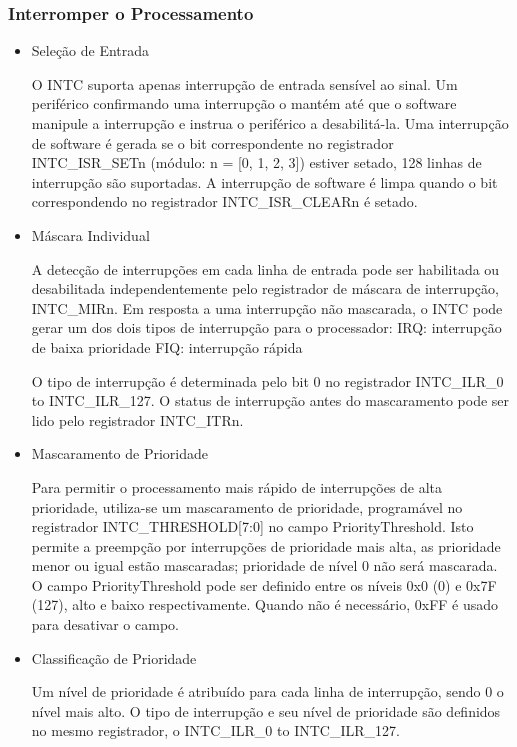 \documentclass[12pt]{article}
\begin{document}
		\subsubsection{Interromper o Processamento}
			\begin{itemize}
				\item Seleção de Entrada \
				
					O INTC suporta apenas interrupção de entrada sensível ao sinal. Um periférico confirmando uma interrupção o mantém até que o software manipule a interrupção e instrua o periférico a desabilitá-la. Uma interrupção de software é gerada se o bit correspondente no registrador INTC\_ISR\_SETn (módulo: n = [0, 1, 2, 3]) estiver setado, 128 linhas de interrupção são suportadas. A interrupção de software é limpa quando o bit correspondendo no registrador INTC\_ISR\_CLEARn é setado. 
					\newpage
				\item Máscara Individual \
				
					A detecção de interrupções em cada linha de entrada pode ser habilitada ou desabilitada independentemente pelo registrador de máscara de interrupção, INTC\_MIRn. Em resposta a uma interrupção não mascarada, o INTC pode gerar um dos dois tipos de interrupção para o processador:
						\subitem IRQ: interrupção de baixa prioridade
						\subitem FIQ: interrupção rápida \
						
					O tipo de interrupção é determinada pelo bit 0 no registrador INTC\_ILR\_0 to INTC\_ILR\_127. O status de interrupção antes do mascaramento pode ser lido pelo registrador INTC\_ITRn.
				\item Mascaramento de Prioridade \
				
					Para permitir o processamento mais rápido de interrupções de alta prioridade, utiliza-se um mascaramento de prioridade, programável no registrador INTC\_THRESHOLD[7:0] no campo PriorityThreshold. Isto permite a preempção por interrupções de prioridade mais alta, as prioridade menor ou igual estão mascaradas; prioridade de nível 0 não será mascarada. O campo PriorityThreshold pode ser definido entre os níveis 0x0 (0) e 0x7F (127), alto e baixo respectivamente. Quando não é necessário, 0xFF é usado para desativar o campo.
				\item Classificação de Prioridade \
				
					Um nível de prioridade é atribuído para cada linha de interrupção, sendo 0 o nível mais alto. O tipo de interrupção e seu nível de prioridade são definidos no mesmo registrador, o INTC\_ILR\_0 to INTC\_ILR\_127. 
				
			\end{itemize}
\end{document}
